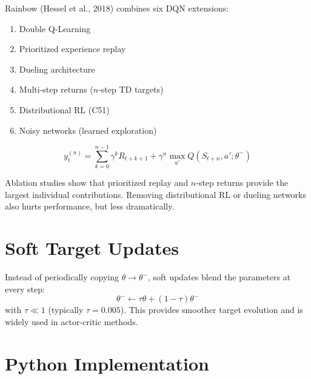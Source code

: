 \begin{definition}[Rainbow]
Rainbow (Hessel et al., 2018) combines six DQN extensions:
\begin{enumerate}
    \item Double Q-Learning
    \item Prioritized experience replay
    \item Dueling architecture
    \item Multi-step returns ($n$-step TD targets)
    \item Distributional RL (C51)
    \item Noisy networks (learned exploration)
\end{enumerate}
\end{definition}

\begin{keyformulas}[title=\textbf{$n$-Step DQN Target}]
\[
    y_t^{(n)} = \sum_{k=0}^{n-1} \gamma^k R_{t+k+1}
    + \gamma^n \max_{a'} Q(S_{t+n}, a'; \theta^-)
\]
\end{keyformulas}

\begin{proposition}
Ablation studies show that prioritized replay and $n$-step returns
provide the largest individual contributions. Removing distributional
RL or dueling networks also hurts performance, but less dramatically.
\end{proposition}

\section{Soft Target Updates}
\label{sec:soft_target}

\begin{definition}
Instead of periodically copying $\theta \to \theta^-$, soft updates
blend the parameters at every step:
\[
    \theta^- \leftarrow \tau \theta + (1 - \tau) \theta^-
\]
with $\tau \ll 1$ (typically $\tau = 0.005$). This provides smoother
target evolution and is widely used in actor-critic methods.
\end{definition}

\section{Python Implementation}
\label{sec:dqn:code}

